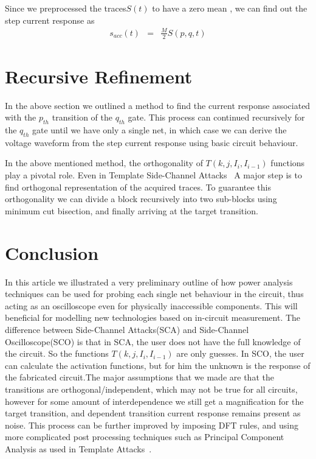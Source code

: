 \documentclass[a4]{IEEEtran}
\begin{document}
Since we preprocessed the traces$S(t)$ to have a zero mean , we can find out the step current response as
\begin{eqnarray}
s_{acc}(t) & = & \frac{M}{2} S(p,q,t) 
\end{eqnarray}
\vspace{1em}
\section{Recursive Refinement}
In the above section we outlined a method to find the current response associated with the $p_{th}$ transition of the $q_{th}$ gate.
This process can continued recursively for the $q_{th}$ gate until we have only a single net, in which case we can derive
the voltage waveform from the step current response using basic circuit behaviour.

In the above mentioned method, the orthogonality of $T(k,j,I_i,I_{i-1})$ functions play a pivotal role. Even in Template Side-Channel Attacks~\cite{Template}
A major step is to find orthogonal representation of the acquired traces.
To guarantee this orthogonality
we can divide a block recursively into two sub-blocks using minimum cut bisection, and finally arriving at the target transition.

\section{Conclusion}

In this article we illustrated a very preliminary outline of how power analysis techniques can be used for probing each single net 
behaviour in the circuit, thus acting as an oscilloscope even for physically inaccessible components. This will beneficial for modelling 
new technologies based on in-circuit measurement. The difference between Side-Channel Attacks(SCA)
and Side-Channel Oscilloscope(SCO) is that in SCA, the user does not have the full knowledge of the circuit. So the functions $T(k,j,I_i,I_{i-1})$ are only guesses.
In SCO, the user can calculate the activation functions, but for him the unknown is the response of the fabricated circuit.The major assumptions that we made
are that the transitions are orthogonal/independent, which may not be true for all circuits, however for some amount of interdependence
we still get a magnification for the target transition, and dependent transition current response  remains present as noise. 
This process can be further improved by imposing DFT rules, and using more complicated post processing techniques such as Principal Component Analysis
as used in Template Attacks~\cite{Template}.


  
\end{document}
